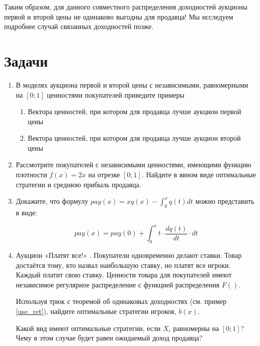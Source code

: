 Таким образом, для данного совместного распределения доходностей аукционы первой и второй цены не одинаково выгодны для продавца! Мы исследуем подробнее случай связанных доходностей позже.



\section{Задачи}


\begin{enumerate}
\item В моделях аукциона первой и второй цены с независимыми, равномерными на $ [0;1] $ ценностями покупателей приведите примеры
\begin{enumerate}
\item Вектора ценностей, при котором для продавца лучше аукцион первой цены
\item Вектора ценностей, при котором для продавца лучше аукцион второй цены
\end{enumerate}


\item Рассмотрите покупателей с независимыми ценностями, имеющими функцию плотности $ f(x)=2x $ на отрезке $ [0;1] $. Найдите в явном виде оптимальные стратегии и среднюю прибыль продавца.



\item Докажите, что формулу $ pay(x)=xq(x)-\int_{0}^{x}q(t)dt$ можно представить в виде:

\begin{equation}
pay(x)=pay(0)+\int_{0}^{x}t \cdot \frac{dq(t)}{dt}\cdot dt
\end{equation}



\item Аукцион «Платят все!» . Покупатели одновременно делают ставки. Товар достаётся тому, кто назвал наибольшую ставку, но платят все игроки. Каждый платит свою ставку. Ценности товара для покупателей имеют независимое регулярное распределение с функцией распределения $ F() $.

Используя трюк с теоремой об одинаковых доходностях (см. пример \ref{use_ret}), найдите оптимальные стратегии игроков, $ b(x) $.

Какой вид имеют оптимальные стратегии, если $ X_{i} $ равномерны на $ [0;1] $? Чему в этом случае будет равен ожидаемый доход продавца?





\end{enumerate}
